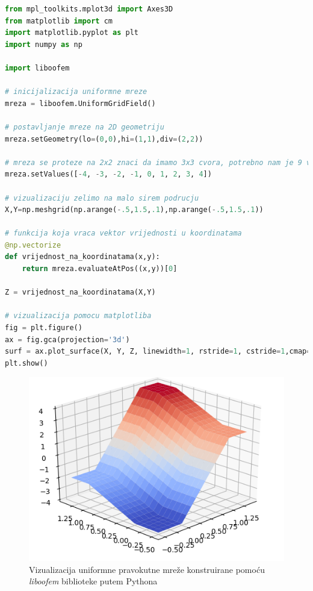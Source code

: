 \documentclass[a4paper,twoside,12pt]{memoir} %
\begin{document}
\begin{lstlisting}[language=python, label={code:python_oofem_matplotlib}, caption={Konstrukcija mrežastog modela i vizualizacija}]
from mpl_toolkits.mplot3d import Axes3D
from matplotlib import cm
import matplotlib.pyplot as plt
import numpy as np

import liboofem

# inicijalizacija uniformne mreze
mreza = liboofem.UniformGridField()

# postavljanje mreze na 2D geometriju
mreza.setGeometry(lo=(0,0),hi=(1,1),div=(2,2))

# mreza se proteze na 2x2 znaci da imamo 3x3 cvora, potrebno nam je 9 vrijednosti
mreza.setValues([-4, -3, -2, -1, 0, 1, 2, 3, 4])

# vizualizaciju zelimo na malo sirem podrucju
X,Y=np.meshgrid(np.arange(-.5,1.5,.1),np.arange(-.5,1.5,.1))

# funkcija koja vraca vektor vrijednosti u koordinatama
@np.vectorize
def vrijednost_na_koordinatama(x,y):
    return mreza.evaluateAtPos((x,y))[0]

Z = vrijednost_na_koordinatama(X,Y)

# vizualizacija pomocu matplotliba
fig = plt.figure()
ax = fig.gca(projection='3d')
surf = ax.plot_surface(X, Y, Z, linewidth=1, rstride=1, cstride=1,cmap=cm.coolwarm, shade=True)
plt.show()
\end{lstlisting}

\begin{figure}[h!t]
\begin{center}
\includegraphics[scale=0.61]{pictures/chapter_oofem/liboofem_mesh_grid.png}
\caption{Vizualizacija uniformne pravokutne mreže konstruirane pomoću \textit{liboofem} biblioteke putem Pythona}
\label{fig:visualization_of_oofem_mesh_grid_with_python}
\end{center}
\end{figure}
\end{document}
